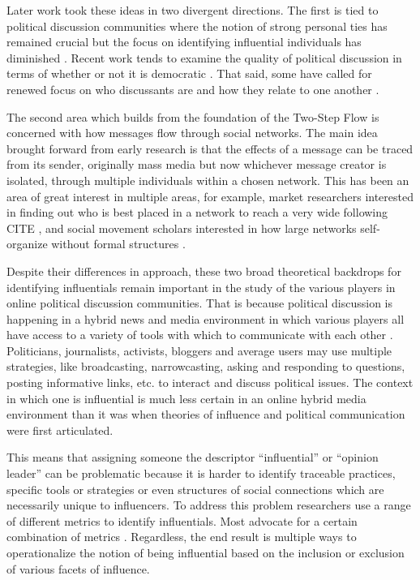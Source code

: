 \documentclass[a4paper,12pt]{article}
\begin{document}
Later work took these ideas in two divergent directions. The first is tied to political discussion communities where the notion of strong personal ties has remained crucial but the focus on identifying influential individuals has diminished \cite{Eveland2011, HuckfeldtSprague1995}. Recent work tends to examine the quality of political discussion in terms of whether or not it is democratic \cite{HuckfeldtSprague1995, Mutz2006}. That said, some have called for renewed focus on who discussants are and how they relate to one another \cite{Eveland2011}.

The second area which builds from the foundation of the Two-Step Flow is concerned with how messages flow through social networks. The main idea brought forward from early research is that the effects of a message can be traced from its sender, originally mass media but now whichever message creator is isolated, through multiple individuals within a chosen network. This has been an area of great interest in multiple areas, for example, market researchers interested in finding out who is best placed in a network to reach a very wide following CITE \cite{Bakshy, Watts2007, HillProvostVolinsky2006}, and social movement scholars interested in how large networks self-organize without formal structures \cite{GonzalezBailonBorgeHolthoeferMoreno2012}.

Despite their differences in approach, these two broad theoretical backdrops for identifying influentials remain important in the study of the various players in online political discussion communities. That is because political discussion is happening in a hybrid news and media environment in which various players all have access to a variety of tools with which to communicate with each other \cite{Chadwick2011}. Politicians, journalists, activists, bloggers and average users may use multiple strategies, like broadcasting, narrowcasting, asking and responding to questions, posting informative links, etc. to interact and discuss political issues. The context in which one is influential is much less certain in an online hybrid media environment than it was when theories of influence and political communication were first articulated. 

This means that assigning someone the descriptor ``influential'' or ``opinion leader'' can be problematic because it is harder to identify traceable practices, specific tools or strategies or even structures of social connections which are necessarily unique to influencers. To address this problem researchers use a range of different metrics to identify influentials. Most advocate for a certain combination of metrics \cite{Quercia2011a, GonzalezBailonBorgeHolthoeferMoreno2012, Lee2010, Chang}. Regardless, the end result is multiple ways to operationalize the notion of being influential based on the inclusion or exclusion of various facets of influence.
\end{document}
